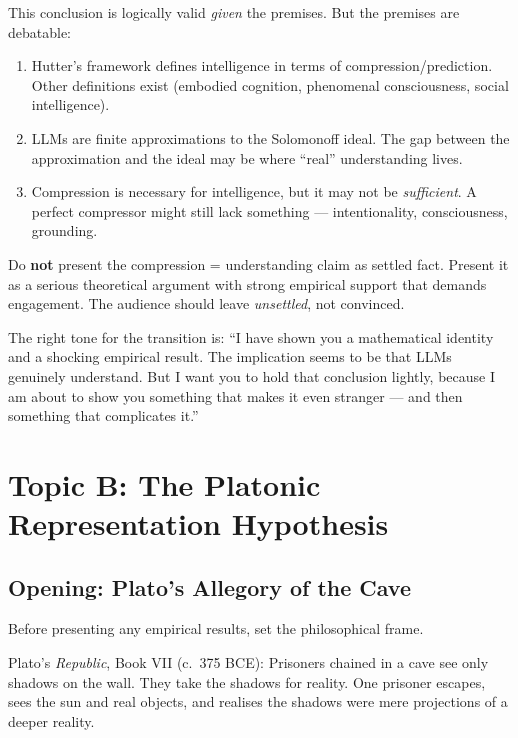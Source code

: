\documentclass[11pt, a4paper]{article}
\begin{document}
\begin{warning}
This conclusion is logically valid \emph{given} the premises. But the
premises are debatable:
\begin{enumerate}[leftmargin=2em]
  \item Hutter's framework defines intelligence in terms of
    compression/prediction. Other definitions exist (embodied cognition,
    phenomenal consciousness, social intelligence).
  \item LLMs are finite approximations to the Solomonoff ideal. The gap
    between the approximation and the ideal may be where ``real''
    understanding lives.
  \item Compression is necessary for intelligence, but it may not be
    \emph{sufficient}. A perfect compressor might still lack something ---
    intentionality, consciousness, grounding.
\end{enumerate}
Do \textbf{not} present the compression = understanding claim as settled
fact. Present it as a serious theoretical argument with strong empirical
support that demands engagement. The audience should leave \emph{unsettled},
not convinced.
\end{warning}

\begin{speakingnote}
The right tone for the transition is: ``I have shown you a mathematical
identity and a shocking empirical result. The implication seems to be that
LLMs genuinely understand. But I want you to hold that conclusion lightly,
because I am about to show you something that makes it even stranger ---
and then something that complicates it.''
\end{speakingnote}


\section{Topic B: The Platonic Representation Hypothesis}

\subsection{Opening: Plato's Allegory of the Cave}

Before presenting any empirical results, set the philosophical frame.

Plato's \emph{Republic}, Book VII (c.\ 375 BCE): Prisoners chained in a
cave see only shadows on the wall. They take the shadows for reality. One
prisoner escapes, sees the sun and real objects, and realises the shadows
were mere projections of a deeper reality.
\end{document}
